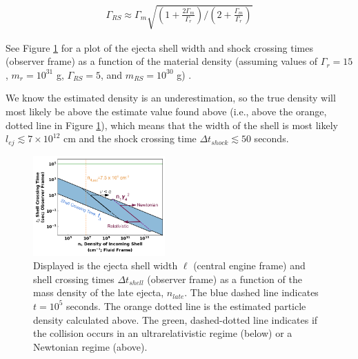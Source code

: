 \documentclass[linenumbers,twocolumn]{aastex631}
\begin{document}
{    \begin{align}
        \Gamma_{RS} \approx \Gamma_m \sqrt{\left(1 + \frac{2\Gamma_m}{\Gamma_r}\right)/\left(2+\frac{\Gamma_m}{\Gamma_r}\right)}
    \end{align}

    See Figure \ref{fig: plot} for a plot of the ejecta shell width and shock crossing times (observer frame) as a function of the material density (assuming values of $\Gamma_{r}=15$, $m_{r}=10^{31}$ g, $\Gamma_{RS}=5$, and $m_{RS}=10^{30}$ g) . 

    We know the estimated density is an underestimation, so the true density will most likely be above the estimate value found above (i.e., above the orange, dotted line in Figure \ref{fig: plot}), which means that the width of the shell is most likely $l_{ej}\lesssim 7\times 10^{12}$ cm and the shock crossing time $\Delta t_{shock} \lesssim 50$ seconds.

    \begin{figure}[t!]
        \centering
        \includegraphics[width=0.45\textwidth]{shell-cross-time.png}
        \caption{Displayed is the ejecta shell width $\ell$ (central engine frame) and shell crossing times $\Delta t_{shell}$ (observer frame) as a function of the mass density of the late ejecta, $n_{late}$. The blue dashed line indicates $t=10^5$ seconds. The orange dotted line is the estimated particle density calculated above. The green, dashed-dotted line indicates if the collision occurs in an ultrarelativistic regime (below) or a Newtonian regime (above).}
        \label{fig: plot}
    \end{figure}
}
\end{document}
